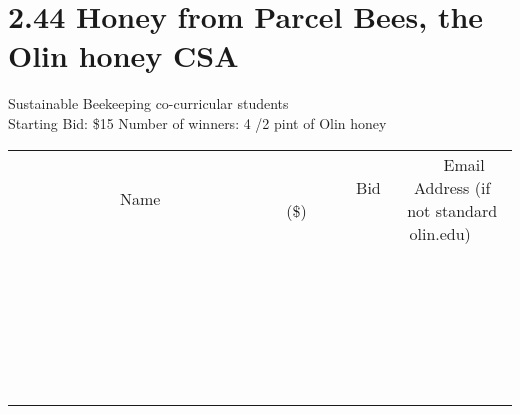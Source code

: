 \documentclass[11pt]{article}
\begin{document}
\section*{2.44 Honey from Parcel Bees, the Olin honey CSA}
Sustainable Beekeeping co-curricular students
\\
Starting Bid: \$15
\newline
Number of winners: 4
/2 pint of Olin honey
\\[6ex]
\begin{tabular}{c c c}
~~~~~~~~~~~~~Name~~~~~~~~~~~~~ & ~~~~~~~~~Bid (\$)~~~~~~~~~  & ~~~Email Address (if not standard olin.edu)~~~\\
 & & \\
\hline
 & & \\
\hline
 & & \\
\hline
 & & \\
\hline
 & & \\
\hline
 & & \\
\hline
 & & \\
\hline
 & & \\
\hline
 & & \\
\hline
 & & \\
\hline
 & & \\
\hline
 & & \\
\hline
 & & \\
\hline
 & & \\
\hline
 & & \\
\hline
 & & \\
\hline
 & & \\
\hline
 & & \\
\hline
 & & \\
\hline
 & & \\
\hline
 & & \\
\hline
 & & \\
\hline
 & & \\
\hline
 & & \\
\hline
 & & \\
\hline
 & & \\
\hline
\end{tabular}
\newpage
\end{document}
